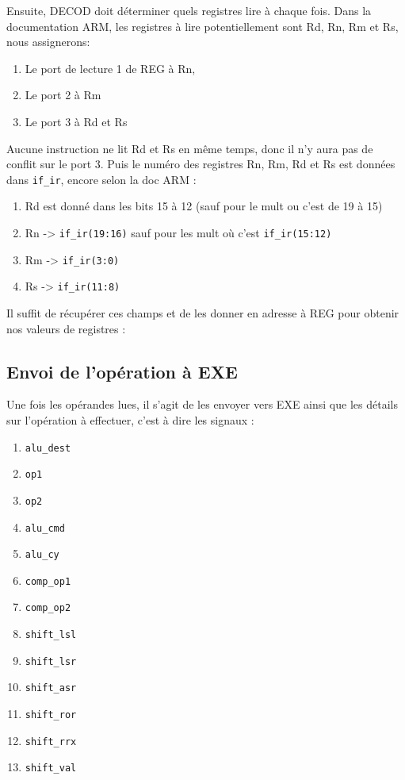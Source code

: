 \documentclass{article}
\begin{document}
Ensuite, DECOD doit déterminer quels registres lire à chaque fois.
Dans la documentation ARM, les registres à lire potentiellement sont Rd, Rn, Rm et Rs,
nous assignerons:
\begin{enumerate}
  \item Le port de lecture 1 de REG     à Rn,
  \item Le port 2 à Rm
  \item Le port 3 à Rd et Rs
\end{enumerate}
Aucune instruction ne lit Rd et Rs en même temps, donc il n'y aura pas de conflit sur le port 3.
Puis le numéro des registres Rn, Rm, Rd et Rs est données dans \texttt{if\_ir}, encore selon la doc ARM :
\begin{enumerate}
  \item Rd est donné dans les bits 15 à 12 (sauf pour le mult ou c'est de 19 à 15)
  \item Rn -> \texttt{if\_ir(19:16)} sauf pour les mult où c'est \texttt{if\_ir(15:12)}
  \item Rm -> \texttt{if\_ir(3:0)}
  \item Rs -> \texttt{if\_ir(11:8)}
\end{enumerate}
Il suffit de récupérer ces champs et de les donner en adresse à REG pour obtenir nos valeurs de registres :



\subsection{Envoi de l'opération à EXE}

Une fois les opérandes lues, il s'agit de les envoyer vers EXE ainsi que les détails
sur l'opération à effectuer, c'est à dire les signaux :
\begin{enumerate}
  \item \texttt{alu\_dest}
  \item \texttt{op1}
  \item \texttt{op2}
  \item \texttt{alu\_cmd}
  \item \texttt{alu\_cy}
  \item \texttt{comp\_op1}
  \item \texttt{comp\_op2}
  \item \texttt{shift\_lsl}
  \item \texttt{shift\_lsr}
  \item \texttt{shift\_asr}
  \item \texttt{shift\_ror}
  \item \texttt{shift\_rrx}
  \item \texttt{shift\_val}
\end{enumerate}
\end{document}
